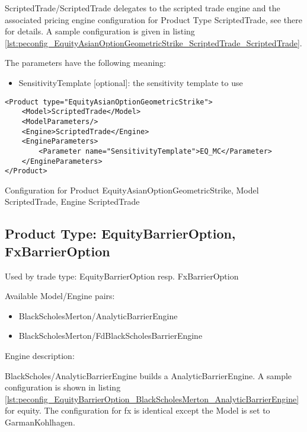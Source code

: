 ScriptedTrade/ScriptedTrade delegates to the scripted trade engine and the associated pricing engine configuration for
Product Type ScriptedTrade, see there for details. A sample configuration is given in listing
\ref{lst:peconfig_EquityAsianOptionGeometricStrike_ScriptedTrade_ScriptedTrade}.

The parameters have the following meaning:

\begin{itemize}
\item SensitivityTemplate [optional]: the sensitivity template to use 
\end{itemize}

\begin{longlisting}
\begin{verbatim}
<Product type="EquityAsianOptionGeometricStrike">
    <Model>ScriptedTrade</Model>
    <ModelParameters/>
    <Engine>ScriptedTrade</Engine>
    <EngineParameters>
        <Parameter name="SensitivityTemplate">EQ_MC</Parameter>
    </EngineParameters>
</Product>
\end{verbatim}
\caption{Configuration for Product EquityAsianOptionGeometricStrike, Model ScriptedTrade, Engine ScriptedTrade}
\label{lst:peconfig_EquityAsianOptionGeometricStrike_ScriptedTrade_ScriptedTrade}
\end{longlisting}

\subsection{Product Type: EquityBarrierOption, FxBarrierOption}

Used by trade type: EquityBarrierOption resp. FxBarrierOption

Available Model/Engine pairs:

\begin{itemize}
\item BlackScholesMerton/AnalyticBarrierEngine
\item BlackScholesMerton/FdBlackScholesBarrierEngine
\end{itemize}

Engine description:

BlackScholes/AnalyticBarrierEngine builds a AnalyticBarrierEngine. A sample configuration is shown in listing
\ref{lst:peconfig_EquityBarrierOption_BlackScholesMerton_AnalyticBarrierEngine} for equity. The configuration for fx is
identical except the Model is set to GarmanKohlhagen.

